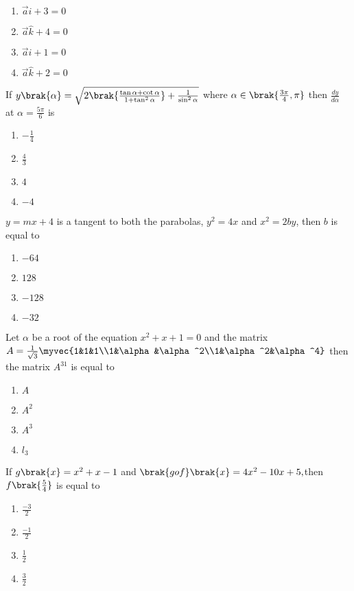     \begin{enumerate}
        \item $\vec{a}\hat{i}+3=0$
        \item $\vec{a}\hat{k}+4=0$
        \item $\vec{a}\hat{i}+1=0$
        \item $\vec{a}\hat{k}+2=0$\\
    \end{enumerate}
    \item If $y\brak{\alpha}=\sqrt{2\brak{\frac{\tan\alpha+\cot\alpha}{1+\tan^2\alpha}}+\frac{1}{\sin^2\alpha}}$ where $\alpha \in \brak{\frac{3\pi}{4},\pi}$ then $\frac{dy}{d\alpha}$ at $\alpha=\frac{5\pi}{6}$ is
    \begin{enumerate}
        \item $-\frac{1}{4}$
        \item $\frac{4}{3}$
        \item $4$
        \item $-4$\\
    \end{enumerate}
    \item $y = mx + 4$ is a tangent to both the parabolas, $y^2 = 4x$ and $x^2 = 2by$, then $b$ is equal to
    \begin{enumerate}
        \item $-64$
        \item $128$
        \item $-128$
        \item $-32$\\
    \end{enumerate}
    \item Let $\alpha$ be a root of the equation $x^2 + x+ 1= 0$ and the matrix $A=\frac{1}{\sqrt{3}}\myvec{1&1&1\\1&\alpha&\alpha^2\\1&\alpha^2&\alpha^4}$
    then the matrix $A^{31}$ is equal to
    \begin{enumerate}
        \item $A$
        \item $A^2$
        \item $A^3$
        \item $l_3$\\
   \end{enumerate}
    \item If $g\brak{x}=x^2+x-1$ and $\brak{gof}\brak{x}=4x^2-10x+5,$then $f\brak{\frac{5}{4}}$ is equal to
    \begin{enumerate}
        \item $\frac{-3}{2}$
        \item $\frac{-1}{2}$
        \item $\frac{1}{2}$
        \item $\frac{3}{2}$\\
    \end{enumerate}
